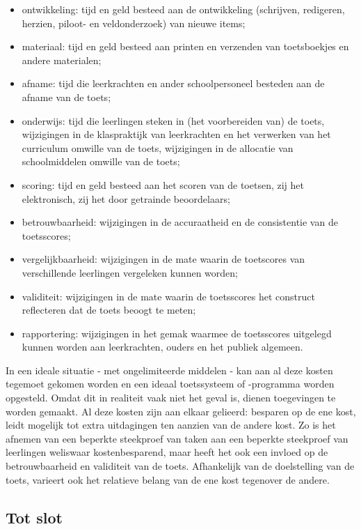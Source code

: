 \documentclass[
  letterpaper,
]{report}
\providecommand{\tightlist}{%
  \setlength{\itemsep}{0pt}\setlength{\parskip}{0pt}}
\begin{document}
\begin{itemize}
\tightlist
\item
  ontwikkeling: tijd en geld besteed aan de ontwikkeling (schrijven,
  redigeren, herzien, piloot- en veldonderzoek) van nieuwe items;
\item
  materiaal: tijd en geld besteed aan printen en verzenden van
  toetsboekjes en andere materialen;
\item
  afname: tijd die leerkrachten en ander schoolpersoneel besteden aan de
  afname van de toets;
\item
  onderwijs: tijd die leerlingen steken in (het voorbereiden van) de
  toets, wijzigingen in de klaspraktijk van leerkrachten en het
  verwerken van het curriculum omwille van de toets, wijzigingen in de
  allocatie van schoolmiddelen omwille van de toets;
\item
  scoring: tijd en geld besteed aan het scoren van de toetsen, zij het
  elektronisch, zij het door getrainde beoordelaars;
\item
  betrouwbaarheid: wijzigingen in de accuraatheid en de consistentie van
  de toetsscores;
\item
  vergelijkbaarheid: wijzigingen in de mate waarin de toetscores van
  verschillende leerlingen vergeleken kunnen worden;
\item
  validiteit: wijzigingen in de mate waarin de toetsscores het construct
  reflecteren dat de toets beoogt te meten;
\item
  rapportering: wijzigingen in het gemak waarmee de toetsscores
  uitgelegd kunnen worden aan leerkrachten, ouders en het publiek
  algemeen.
\end{itemize}

In een ideale situatie - met ongelimiteerde middelen - kan aan al deze
kosten tegemoet gekomen worden en een ideaal toetssysteem of -programma
worden opgesteld. Omdat dit in realiteit vaak niet het geval is, dienen
toegevingen te worden gemaakt. Al deze kosten zijn aan elkaar gelieerd:
besparen op de ene kost, leidt mogelijk tot extra uitdagingen ten
aanzien van de andere kost. Zo is het afnemen van een beperkte
steekproef van taken aan een beperkte steekproef van leerlingen
weliswaar kostenbesparend, maar heeft het ook een invloed op de
betrouwbaarheid en validiteit van de toets. Afhankelijk van de
doelstelling van de toets, varieert ook het relatieve belang van de ene
kost tegenover de andere.

\hypertarget{tot-slot}{%
\subsection{Tot slot}\label{tot-slot}}
\end{document}
